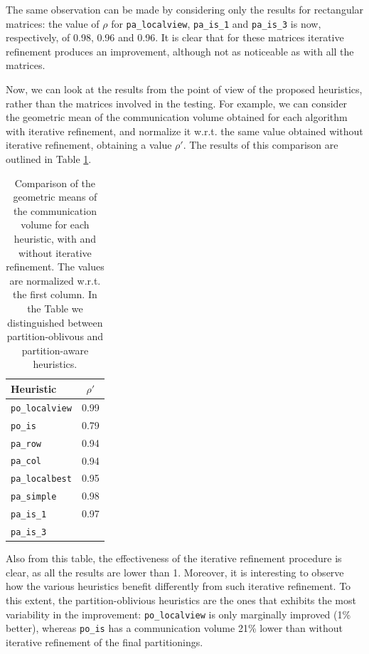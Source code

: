 The same observation can be made by considering only the results for rectangular matrices: the value of $\rho$ for \verb|pa_localview|, \verb|pa_is_1| and \verb|pa_is_3| is now, respectively, of 0.98, 0.96 and 0.96. It is clear that for these matrices iterative refinement produces an improvement, although not as noticeable as with all the matrices.

Now, we can look at the results from the point of view of the proposed heuristics, rather than the matrices involved in the testing. For example, we can consider the geometric mean of the communication volume obtained for each algorithm with iterative refinement, and normalize it w.r.t. the same value obtained without iterative refinement, obtaining a value $\rho'$. The results of this comparison are outlined in Table \ref{tab:comparison_ir}.

\begin{table}[H]
	\centering
	\begin{tabular}{|l|c|}\hline
		Heuristic & $\rho'$ \\ \hline
		\verb|po_localview|  & 0.99 \\
		\verb|po_is| & 0.79 \\ \hline
		\verb|pa_row| & 0.94 \\
		\verb|pa_col| & 0.94 \\
		\verb|pa_localbest| & 0.95 \\
		\verb|pa_simple| & 0.98 \\
		\verb|pa_is_1| & 0.97 \\
		\verb|pa_is_3| &  \\ \hline
	\end{tabular}
	\caption{Comparison of the geometric means of the communication volume for each heuristic, with and without iterative refinement. The values are normalized w.r.t. the first column. In the Table we distinguished between partition-oblivous and partition-aware heuristics.} \label{tab:comparison_ir}
\end{table}

Also from this table, the effectiveness of the iterative refinement procedure is clear, as all the results are lower than 1. Moreover, it is interesting to observe how the various heuristics benefit differently from such iterative refinement. To this extent, the partition-oblivious heuristics are the ones that exhibits the most variability in the improvement: \verb|po_localview| is only marginally improved (1\% better), whereas \verb|po_is| has a communication volume 21\% lower than without iterative refinement of the final partitionings.

